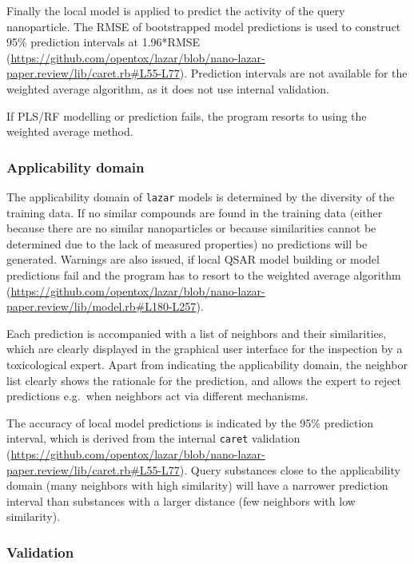 \documentclass[utf8]{frontiersHLTH} %
\begin{document}
Finally the local model is applied to predict the activity of the query
nanoparticle. The RMSE of bootstrapped model predictions is used to
construct 95\% prediction intervals at 1.96*RMSE
(\url{https://github.com/opentox/lazar/blob/nano-lazar-paper.review/lib/caret.rb\#L55-L77}).
Prediction intervals are not available for the weighted average
algorithm, as it does not use internal validation.

If PLS/RF modelling or prediction fails, the program resorts to using
the weighted average method.

\subsubsection{Applicability domain}\label{applicability-domain}

The applicability domain of \texttt{lazar} models is determined by the
diversity of the training data. If no similar compounds are found in the
training data (either because there are no similar nanoparticles or
because similarities cannot be determined due to the lack of measured
properties) no predictions will be generated. Warnings are also issued,
if local QSAR model building or model predictions fail and the program
has to resort to the weighted average algorithm
(\url{https://github.com/opentox/lazar/blob/nano-lazar-paper.review/lib/model.rb\#L180-L257}).

Each prediction is accompanied with a list of neighbors and their
similarities, which are clearly displayed in the graphical user
interface for the inspection by a toxicological expert. Apart from
indicating the applicability domain, the neighbor list clearly shows the
rationale for the prediction, and allows the expert to reject
predictions e.g.~when neighbors act via different mechanisms.

The accuracy of local model predictions is indicated by the 95\%
prediction interval, which is derived from the internal \texttt{caret}
validation
(\url{https://github.com/opentox/lazar/blob/nano-lazar-paper.review/lib/caret.rb\#L55-L77}).
Query substances close to the applicability domain (many neighbors with
high similarity) will have a narrower prediction interval than
substances with a larger distance (few neighbors with low similarity).

\subsubsection{Validation}\label{validation}
\end{document}
